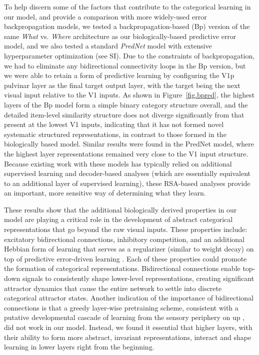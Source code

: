 \documentclass[11pt,twoside]{article}
\newif\myifpdf
\begin{document}
To help discern some of the factors that contribute to the categorical learning in our model, and provide a comparison with more widely-used error backpropagation models, we tested a backpropagation-based (Bp) version of the same \emph{What} vs. \emph{Where} architecture as our biologically-based predictive error model, and we also tested a standard \emph{PredNet} model \citep{LotterKreimanCox16} with extensive hyperparameter optimization (see SI).  Due to the constraints of backpropagation, we had to eliminate any bidirectional connectivity loops in the Bp version, but we were able to retain a form of predictive learning by configuring the V1p pulvinar layer as the final target output layer, with the target being the next visual input relative to the V1 inputs.  As shown in Figure~\ref{fig.bpred}, the highest layers of the Bp model form a simple binary category structure overall, and the detailed item-level similarity structure does not diverge significantly from that present at the lowest V1 inputs, indicating that it has not formed novel systematic structured representations, in contrast to those formed in the biologically based model.  Similar results were found in the PredNet model, where the highest layer representations remained very close to the V1 input structure.  Because existing work with these models has typically relied on additional supervised learning and decoder-based analyses (which are essentially equivalent to an additional layer of supervised learning), these RSA-based analyses provide an important, more sensitive way of determining what they learn.

These results show that the additional biologically derived properties in our model are playing a critical role in the development of abstract categorical representations that go beyond the raw visual inputs. These properties include: excitatory bidirectional connections, inhibitory competition, and an additional Hebbian form of learning that serves as a regularizer (similar to weight decay) on top of predictive error-driven learning \citep{OReilly98,OReillyMunakata00}.  Each of these properties could promote the formation of categorical representations. Bidirectional connections enable top-down signals to consistently shape lower-level representations, creating significant attractor dynamics that cause the entire network to settle into discrete categorical attractor states.  Another indication of the importance of bidirectional connections is that a greedy layer-wise pretraining scheme, consistent with a putative developmental cascade of learning from the sensory periphery on up \citep{ShragerJohnson96,BengioYaoAlainEtAl13,Valpola14,HintonSalakhutdinov06}, did not work in our model. Instead, we found it essential that higher layers, with their ability to form more abstract, invariant representations, interact and shape learning in lower layers right from the beginning.
\end{document}

